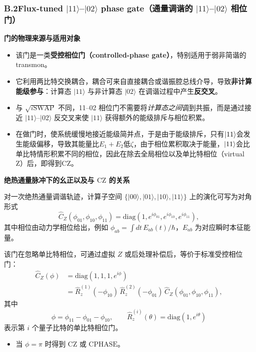 \documentclass[12pt,a4paper,oneside]{ctexbook}
\begin{document}
\subsubsection{B.2\quad Flux-tuned $|11\rangle$--$|02\rangle$ phase gate（通量调谐的 $|11\rangle$--$|02\rangle$ 相位门）}

\noindent\textbf{门的物理来源与适用对象}

\begin{itemize}
  \item 该门是一类\textbf{受控相位门（controlled-phase gate）}，特别适用于弱非简谐的 transmon。
  \item 它利用两比特交换耦合，耦合可来自直接耦合或谐振腔总线介导，导致\textbf{非计算能级参与}：计算态 $|11\rangle$ 与非计算态 $|02\rangle$ 在调谐过程中产生\textbf{反交叉}。
  \item 与 $\sqrt{i\mathrm{SWAP}}$ 不同，11--02 相位门不需要将\emph{计算态之间}调到共振，而是通过接近 $|11\rangle$--$|02\rangle$ 反交叉来使 $|11\rangle$ 获得额外的能级排斥与相位积累。
  \item 在做门时，使系统缓慢地接近能级简并点，于是由于能级排斥，只有$\ket{11}$会发生能级偏移，导致其能量比$E_1 + E_2$低$\zeta$，由于相位累积取决于能量，$\ket{11}$会比单比特情形积累不同的相位，因此在除去全局相位以及单比特相位（virtual Z）后，即得到CZ。
\end{itemize}

\noindent\textbf{绝热通量脉冲下的幺正以及与 $\mathrm{CZ}$ 的关系}

对一次绝热通量调谐轨迹，计算子空间 $\{|00\rangle,|01\rangle,|10\rangle,|11\rangle\}$ 上的演化可写为对角形式
\begin{equation}
  \hat C_Z(\phi_{01},\phi_{10},\phi_{11})
  =
  \mathrm{diag}\!\left(1, e^{i\phi_{01}}, e^{i\phi_{10}}, e^{i\phi_{11}}\right),
  \tag{139}
\end{equation}
其中相位由动力学相位给出，例如 $\phi_{ab}=\int dt\, E_{ab}(t)/\hbar$，$E_{ab}$ 为对应瞬时本征能量。

该门在忽略单比特相位，可通过虚拟 $Z$ 或后处理补偿后，等价于标准受控相位门：
\begin{align}
  \hat C_Z(\phi)
  &=\mathrm{diag}\!\left(1,1,1,e^{i\phi}\right)\nonumber\\
  &= \hat R_z^{(1)}(-\phi_{10})\,\hat R_z^{(2)}(-\phi_{01})\,\hat C_Z(\phi_{01},\phi_{10},\phi_{11}),
  \tag{140}
\end{align}
其中
\[
  \phi=\phi_{11}-\phi_{01}-\phi_{10},\qquad
  \hat R_z^{(i)}(\theta)=\mathrm{diag}(1,e^{i\theta})
\]
表示第 $i$ 个量子比特的单比特相位门。
\begin{itemize}
  \item 当 $\phi=\pi$ 时得到 $\mathrm{CZ}$ 或 $\mathrm{CPHASE}$。
\end{itemize}
\end{document}
